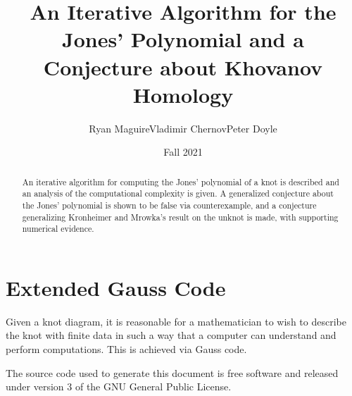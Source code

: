 \documentclass{article}
\title{%
    An Iterative Algorithm for the Jones' Polynomial and a
    Conjecture about Khovanov Homology%
}
\author{Ryan Maguire\hspace{2em}Vladimir Chernov\hspace{2em}Peter Doyle}
\date{Fall 2021}
\theoremstyle{normal}
\theoremstyle{plain}
\begin{document}
    \maketitle
    \begin{abstract}
        An iterative algorithm for computing the Jones' polynomial of a knot
        is described and an analysis of the computational complexity is given.
        A generalized conjecture about the Jones' polynomial is shown to be
        false via counterexample, and a conjecture generalizing Kronheimer and
        Mrowka's result on the unknot is made, with supporting numerical
        evidence.
    \end{abstract}
    \section{Extended Gauss Code}
        Given a knot diagram, it is reasonable for a mathematician to wish to
        describe the knot with finite data in such a way that a computer can
        understand and perform computations. This is achieved via Gauss code.
        
    \newpage
    \par\hfill\par
    The source code used to generate this document is free software and released
    under version 3 of the GNU General Public License.
\end{document}
